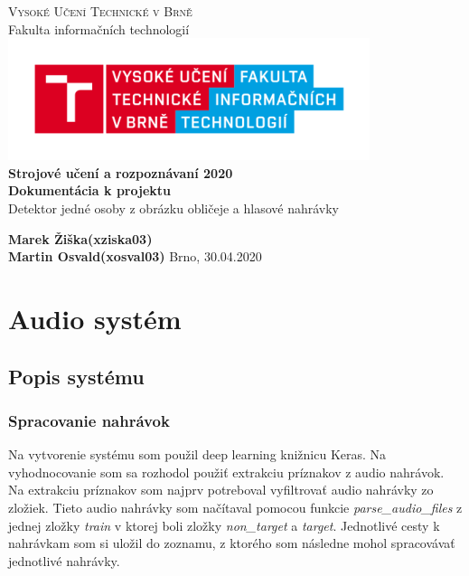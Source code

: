 \documentclass{article}
\begin{document}

    \begin{titlepage}
        \begin{center}
            \textsc{\Huge Vysoké Učení Technické v Brně} \\[0.7cm]
            {\Huge Fakulta informačních technologií}
            \center\includegraphics[width=0.5\linewidth]{./logo.png}\\[5cm]

            \textbf{{\Huge Strojové učení a rozpoznávaní 2020}}\\[0.5cm]

            \textbf{{\huge Dokumentácia k projektu}}\\[0.4cm]
            \LARGE{Detektor jedné osoby z obrázku obličeje a hlasové
nahrávky}\\
            
        \end{center}
        \vfill

        \begin{flushleft}
            \begin{Large}
                \textbf{Marek Žiška}\hspace{44px}\textbf{(xziska03)}\\[0.25cm]
                \textbf{Martin Osvald}\hspace{30px}\textbf{(xosval03)}
            \hfill
            Brno, 30.04.2020
            \end{Large}
        \end{flushleft}

    \end{titlepage}
    \tableofcontents
    \newpage
    \section{Audio systém}
    \subsection{Popis systému}
    \subsubsection{Spracovanie nahrávok}
    \Large{Na vytvorenie systému som použil deep learning knižnicu Keras. Na vyhodnocovanie som sa rozhodol použiť extrakciu príznakov z audio nahrávok. Na extrakciu príznakov som najprv potreboval vyfiltrovať audio nahrávky zo zložiek. Tieto audio nahrávky som načítaval pomocou funkcie \textit{parse\_audio\_files} z jednej zložky \textit{train} v ktorej boli zložky \textit{non\_target} a \textit{target}. Jednotlivé cesty k nahrávkam som si uložil do zoznamu, z ktorého som následne mohol spracovávať jednotlivé nahrávky.}
\end{document}
